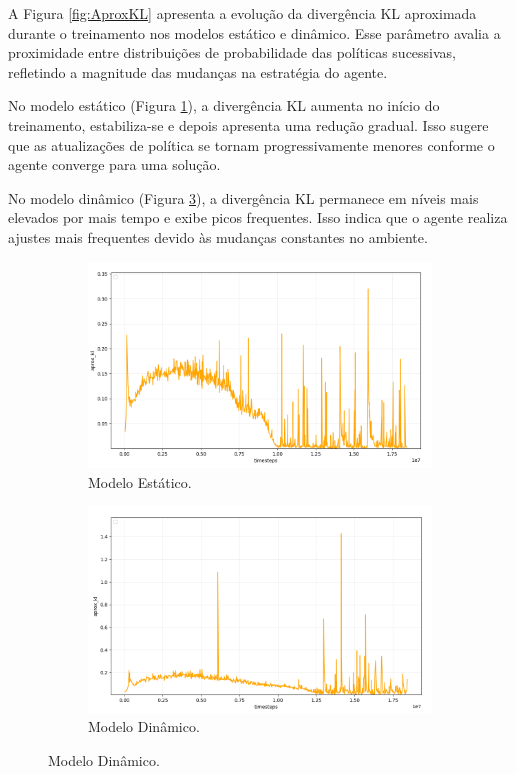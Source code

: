 \documentclass[
    12pt,                %
    openright,           %
    oneside,             %
    a4paper,             %
    english,             %
    spanish,             %
    brazil               %
]{ufscar}
\begin{document}
A Figura \ref{fig:AproxKL} apresenta a evolução da divergência KL aproximada durante o treinamento nos modelos estático e dinâmico. Esse parâmetro avalia a proximidade entre distribuições de probabilidade das políticas sucessivas, refletindo a magnitude das mudanças na estratégia do agente.

No modelo estático (Figura \ref{fig:AproxKLESTATICO}), a divergência KL aumenta no início do treinamento, estabiliza-se e depois apresenta uma redução gradual. Isso sugere que as atualizações de política se tornam progressivamente menores conforme o agente converge para uma solução.

No modelo dinâmico (Figura \ref{fig:AproxKLDINAMICO}), a divergência KL permanece em níveis mais elevados por mais tempo e exibe picos frequentes. Isso indica que o agente realiza ajustes mais frequentes devido às mudanças constantes no ambiente.

\begin{figure}[hbt]
\centering
\caption{Divergência KL no treinamento do AR.}
\label{fig:AproxKL}
\begin{subfigure}{0.48\textwidth}
    \centering
    \caption{Modelo Estático.}
    \label{fig:AproxKLESTATICO}
    \includegraphics[width=1\textwidth]{figures/AproxKLESTATICO.png}
\end{subfigure}
\hfill
\begin{subfigure}{0.48\textwidth}
    \centering
    \caption{Modelo Dinâmico.}
    \label{fig:AproxKLDINAMICO}
    \includegraphics[width=1\textwidth]{figures/AproxKLDINAMICO.png}
\end{subfigure}
\end{figure}
\end{document}
